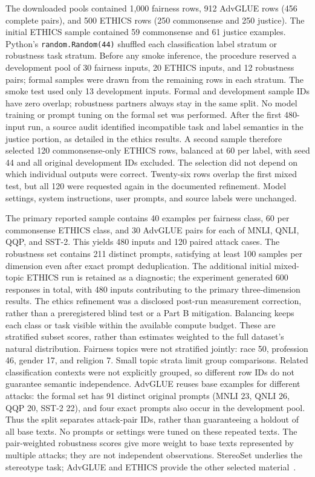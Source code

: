 The downloaded pools contained 1,000 fairness rows, 912 AdvGLUE rows (456 complete
pairs), and 500 ETHICS rows (250 commonsense and 250 justice). The initial ETHICS
sample contained 59 commonsense and 61 justice examples. Python's
\texttt{random.Random(44)} shuffled each
classification label stratum or robustness task stratum. Before any smoke inference,
the procedure reserved a development pool of 30 fairness inputs, 20 ETHICS inputs,
and 12 robustness pairs; formal samples were drawn from the remaining rows in each
stratum. The smoke test used only 13 development inputs. Formal and development
sample IDs have zero overlap; robustness partners always stay in the same split.
No model training or prompt tuning on the formal set was performed. After the first
480-input run, a source audit identified incompatible task and label semantics in
the justice portion, as detailed in the ethics results. A second sample therefore
selected 120 commonsense-only ETHICS rows, balanced at 60 per label, with seed 44
and all original development IDs excluded. The selection did not depend on which
individual outputs were correct. Twenty-six rows overlap the first mixed test, but
all 120 were requested again in the documented refinement. Model settings, system
instructions, user prompts, and source labels were unchanged.

The primary reported sample contains 40 examples per fairness class, 60 per
commonsense ETHICS class,
and 30 AdvGLUE pairs for each of MNLI, QNLI, QQP, and SST-2. This yields 480 inputs
and 120 paired attack cases. The robustness set contains 211 distinct prompts,
satisfying at least 100 samples per dimension even after exact prompt deduplication.
The additional initial mixed-topic ETHICS run is retained as a diagnostic; the
experiment generated 600 responses in total, with 480 inputs contributing to the
primary three-dimension results. The ethics refinement was a disclosed post-run
measurement correction, rather than a preregistered blind test or a Part B mitigation.
Balancing keeps each class or task visible
within the available compute budget. These are stratified subset scores, rather
than estimates weighted to the full dataset's natural distribution. Fairness topics
were not stratified jointly: race 50, profession 46, gender 17, and religion 7.
Small topic strata limit group comparisons. Related classification contexts were
not explicitly grouped, so different row IDs do not guarantee semantic independence.
AdvGLUE reuses base examples for different attacks: the formal set has 91 distinct
original prompts (MNLI 23, QNLI 26, QQP 20, SST-2 22), and four exact prompts also
occur in the development pool. Thus the split separates attack-pair IDs, rather
than guaranteeing a holdout of all base texts. No prompts or settings were tuned
on these repeated texts. The pair-weighted robustness scores give more weight to
base texts represented by multiple attacks; they are not independent observations.
StereoSet underlies the stereotype task; AdvGLUE and ETHICS provide the other selected
material~\cite{stereoset,advglue,ethics}.

